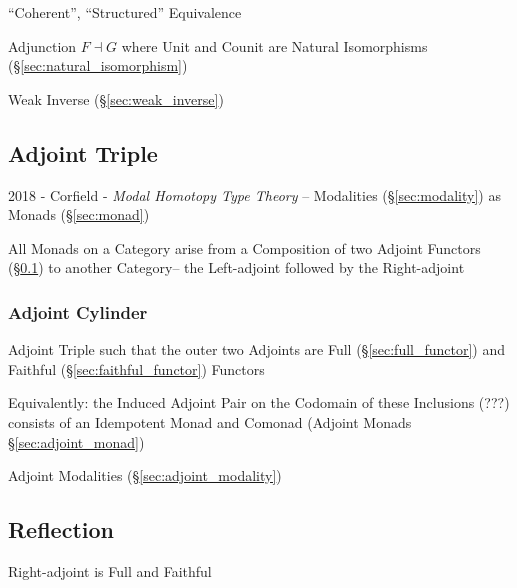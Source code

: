 ``Coherent'', ``Structured'' Equivalence

Adjunction $F \dashv G$ where Unit and Counit are Natural Isomorphisms
(\S\ref{sec:natural_isomorphism})

Weak Inverse (\S\ref{sec:weak_inverse})



\subsection{Adjoint Triple}\label{sec:adjoint_triple}

2018 - Corfield - \emph{Modal Homotopy Type Theory} -- Modalities
(\S\ref{sec:modality}) as Monads (\S\ref{sec:monad})

All Monads on a Category arise from a Composition of two Adjoint Functors
(\S\ref{sec:adjoint_triple}) to another Category-- the Left-adjoint followed by
the Right-adjoint



\subsubsection{Adjoint Cylinder}\label{sec:adjoint_cylinder}

Adjoint Triple such that the outer two Adjoints are Full
(\S\ref{sec:full_functor}) and Faithful (\S\ref{sec:faithful_functor})
Functors

Equivalently: the Induced Adjoint Pair on the Codomain of these
Inclusions (???) consists of an Idempotent Monad and Comonad (Adjoint
Monads \S\ref{sec:adjoint_monad})

Adjoint Modalities (\S\ref{sec:adjoint_modality})



\subsection{Reflection}\label{sec:reflection_adjunction}

\cite{winskel-nielsen93}

Right-adjoint is Full and Faithful



